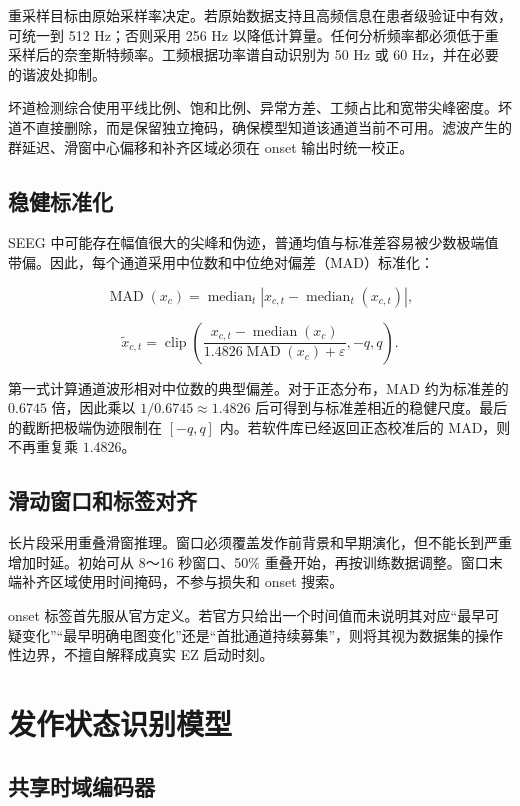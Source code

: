 \documentclass{cumcmthesis_v3}
\numberwithin{figure}{section}
\numberwithin{table}{section}
\begin{document}
重采样目标由原始采样率决定。若原始数据支持且高频信息在患者级验证中有效，可统一到 512 Hz；否则采用 256 Hz 以降低计算量。任何分析频率都必须低于重采样后的奈奎斯特频率。工频根据功率谱自动识别为 50 Hz 或 60 Hz，并在必要的谐波处抑制。

坏道检测综合使用平线比例、饱和比例、异常方差、工频占比和宽带尖峰密度。坏道不直接删除，而是保留独立掩码，确保模型知道该通道当前不可用。滤波产生的群延迟、滑窗中心偏移和补齐区域必须在 onset 输出时统一校正。

\subsection{稳健标准化}

SEEG 中可能存在幅值很大的尖峰和伪迹，普通均值与标准差容易被少数极端值带偏。因此，每个通道采用中位数和中位绝对偏差（MAD）标准化：

\[
\operatorname{MAD}(x_c)=
\operatorname{median}_t\left|x_{c,t}-\operatorname{median}_t(x_{c,t})\right|,
\]

\[
\tilde{x}_{c,t}=\operatorname{clip}\left(
\frac{x_{c,t}-\operatorname{median}(x_c)}
{1.4826\operatorname{MAD}(x_c)+\varepsilon},-q,q\right).
\]

第一式计算通道波形相对中位数的典型偏差。对于正态分布，MAD 约为标准差的 $0.6745$ 倍，因此乘以 $1/0.6745\approx1.4826$ 后可得到与标准差相近的稳健尺度。最后的截断把极端伪迹限制在 $[-q,q]$ 内。若软件库已经返回正态校准后的 MAD，则不再重复乘 $1.4826$。

\subsection{滑动窗口和标签对齐}

长片段采用重叠滑窗推理。窗口必须覆盖发作前背景和早期演化，但不能长到严重增加时延。初始可从 8～16 秒窗口、50\% 重叠开始，再按训练数据调整。窗口末端补齐区域使用时间掩码，不参与损失和 onset 搜索。

onset 标签首先服从官方定义。若官方只给出一个时间值而未说明其对应“最早可疑变化”“最早明确电图变化”还是“首批通道持续募集”，则将其视为数据集的操作性边界，不擅自解释成真实 EZ 启动时刻。

\section{发作状态识别模型}

\subsection{共享时域编码器}
\end{document}
